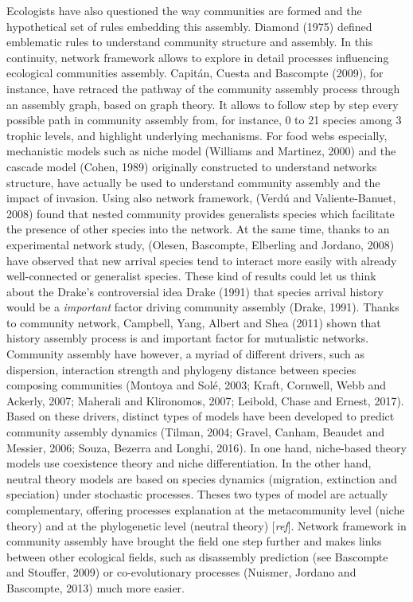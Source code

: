 \documentclass[12pt]{article}
\begin{document}
Ecologists have also questioned the way communities are formed and the
hypothetical set of rules embedding this assembly. Diamond (1975)
defined emblematic rules to understand community structure and assembly.
In this continuity, network framework allows to explore in detail
processes influencing ecological communities assembly. Capitán, Cuesta
and Bascompte (2009), for instance, have retraced the pathway of the
community assembly process through an assembly graph, based on graph
theory. It allows to follow step by step every possible path in
community assembly from, for instance, 0 to 21 species among 3 trophic
levels, and highlight underlying mechanisms. For food webs especially,
mechanistic models such as niche model (Williams and Martinez, 2000) and
the cascade model (Cohen, 1989) originally constructed to understand
networks structure, have actually be used to understand community
assembly and the impact of invasion. Using also network framework,
(Verdú and Valiente‐Banuet, 2008) found that nested community provides
generalists species which facilitate the presence of other species into
the network. At the same time, thanks to an experimental network study,
(Olesen, Bascompte, Elberling and Jordano, 2008) have observed that new
arrival species tend to interact more easily with already well-connected
or generalist species. These kind of results could let us think about
the Drake's controversial idea Drake (1991) that species arrival history
would be a \emph{important} factor driving community assembly (Drake,
1991). Thanks to community network, Campbell, Yang, Albert and Shea
(2011) shown that history assembly process is and important factor for
mutualistic networks. Community assembly have however, a myriad of
different drivers, such as dispersion, interaction strength and
phylogeny distance between species composing communities (Montoya and
Solé, 2003; Kraft, Cornwell, Webb and Ackerly, 2007; Maherali and
Klironomos, 2007; Leibold, Chase and Ernest, 2017). Based on these
drivers, distinct types of models have been developed to predict
community assembly dynamics (Tilman, 2004; Gravel, Canham, Beaudet and
Messier, 2006; Souza, Bezerra and Longhi, 2016). In one hand,
niche-based theory models use coexistence theory and niche
differentiation. In the other hand, neutral theory models are based on
species dynamics (migration, extinction and speciation) under stochastic
processes. Theses two types of model are actually complementary,
offering processes explanation at the metacommunity level (niche theory)
and at the phylogenetic level (neutral theory) {[}\emph{ref}{]}. Network
framework in community assembly have brought the field one step further
and makes links between other ecological fields, such as disassembly
prediction (see Bascompte and Stouffer, 2009) or co-evolutionary
processes (Nuismer, Jordano and Bascompte, 2013) much more easier.
\end{document}
